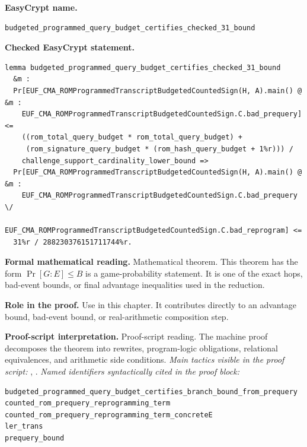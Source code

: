 \begin{formaltheorem}
\noindent\textbf{EasyCrypt name.}
\begin{lstlisting}[language=EasyCrypt,basicstyle=\ttfamily\scriptsize]
budgeted_programmed_query_budget_certifies_checked_31_bound
\end{lstlisting}
\noindent\textbf{Checked EasyCrypt statement.}
\begin{lstlisting}[language=EasyCrypt,basicstyle=\ttfamily\scriptsize]
lemma budgeted_programmed_query_budget_certifies_checked_31_bound
  &m :
  Pr[EUF_CMA_ROMProgrammedTranscriptBudgetedCountedSign(H, A).main() @ &m :
    EUF_CMA_ROMProgrammedTranscriptBudgetedCountedSign.C.bad_prequery] <=
    ((rom_total_query_budget * rom_total_query_budget) +
     (rom_signature_query_budget * (rom_hash_query_budget + 1%r))) /
    challenge_support_cardinality_lower_bound =>
  Pr[EUF_CMA_ROMProgrammedTranscriptBudgetedCountedSign(H, A).main() @ &m :
    EUF_CMA_ROMProgrammedTranscriptBudgetedCountedSign.C.bad_prequery \/
    EUF_CMA_ROMProgrammedTranscriptBudgetedCountedSign.C.bad_reprogram] <=
  31%r / 288230376151711744%r.
\end{lstlisting}
\noindent\textbf{Formal mathematical reading.}
Mathematical theorem. This theorem has the form \(\Pr[G:E] \le B\) is a game-probability statement.  It is one of the exact hops, bad-event bounds, or final advantage inequalities used in the reduction.

\noindent\textbf{Role in the proof.}
Use in this chapter. It contributes directly to an advantage bound, bad-event bound, or real-arithmetic composition step.

\noindent\textbf{Proof-script interpretation.}
Proof-script reading. The machine proof decomposes the theorem into rewrites, program-logic obligations, relational equivalences, and arithmetic side conditions.
\emph{Main tactics visible in the proof script:} , .
\emph{Named identifiers syntactically cited in the proof block:}
\begin{lstlisting}[language=EasyCrypt,basicstyle=\ttfamily\scriptsize]
budgeted_programmed_query_budget_certifies_branch_bound_from_prequery
counted_rom_prequery_reprogramming_term
counted_rom_prequery_reprogramming_term_concreteE
ler_trans
prequery_bound
\end{lstlisting}

\end{formaltheorem}

